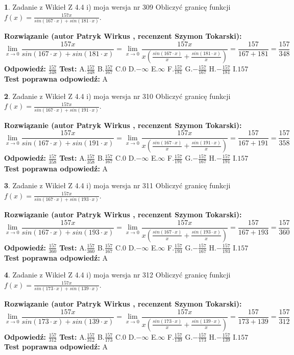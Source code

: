 \documentclass[12pt, a4paper]{article}
\theoremstyle{definition} %
\newtheorem{zad}{}
\newcommand{\zadStart}[1]{\begin{zad}#1\newline}
\newcommand{\zadStop}{\end{zad}}
\newcommand{\rozwStart}[2]{\noindent \textbf{Rozwiązanie (autor #1 , recenzent #2): }\newline}
\newcommand{\rozwStop}{\newline}
\newcommand{\odpStart}{\noindent \textbf{Odpowiedź:}\newline}
\newcommand{\odpStop}{\newline}
\newcommand{\testStart}{\noindent \textbf{Test:}\newline}
\newcommand{\testStop}{\newline}
\newcommand{\kluczStart}{\noindent \textbf{Test poprawna odpowiedź:}\newline}
\newcommand{\kluczStop}{\newline}
\begin{document}
\zadStart{Zadanie z Wikieł Z 4.4 i) moja wersja nr 309}
Obliczyć granicę funkcji $f(x)=\frac{157x}{sin(167\cdot x) +sin(181\cdot x)}$.
\zadStop
\rozwStart{Patryk Wirkus}{Szymon Tokarski}
$$\lim\limits_{x\to 0}\frac{157x}{sin(167\cdot x) +sin(181\cdot x)}=\lim\limits_{x\to 0}\frac{157x}{x(\frac{sin(167\cdot x)}{x}+\frac{sin(181\cdot x)}{x})}=\frac{157}{167+181} = \frac{157}{348}$$
\rozwStop
\odpStart
$\frac{157}{348}$
\odpStop
\testStart
A.$\frac{157}{348}$
B.$\frac{157}{167}$
C.$0$
D.$-\infty$
E.$\infty$
F.$\frac{157}{181}$
G.$-\frac{157}{167}$
H.$-\frac{157}{181}$
I.$157$
\testStop
\kluczStart
A
\kluczStop



\zadStart{Zadanie z Wikieł Z 4.4 i) moja wersja nr 310}
Obliczyć granicę funkcji $f(x)=\frac{157x}{sin(167\cdot x) +sin(191\cdot x)}$.
\zadStop
\rozwStart{Patryk Wirkus}{Szymon Tokarski}
$$\lim\limits_{x\to 0}\frac{157x}{sin(167\cdot x) +sin(191\cdot x)}=\lim\limits_{x\to 0}\frac{157x}{x(\frac{sin(167\cdot x)}{x}+\frac{sin(191\cdot x)}{x})}=\frac{157}{167+191} = \frac{157}{358}$$
\rozwStop
\odpStart
$\frac{157}{358}$
\odpStop
\testStart
A.$\frac{157}{358}$
B.$\frac{157}{167}$
C.$0$
D.$-\infty$
E.$\infty$
F.$\frac{157}{191}$
G.$-\frac{157}{167}$
H.$-\frac{157}{191}$
I.$157$
\testStop
\kluczStart
A
\kluczStop



\zadStart{Zadanie z Wikieł Z 4.4 i) moja wersja nr 311}
Obliczyć granicę funkcji $f(x)=\frac{157x}{sin(167\cdot x) +sin(193\cdot x)}$.
\zadStop
\rozwStart{Patryk Wirkus}{Szymon Tokarski}
$$\lim\limits_{x\to 0}\frac{157x}{sin(167\cdot x) +sin(193\cdot x)}=\lim\limits_{x\to 0}\frac{157x}{x(\frac{sin(167\cdot x)}{x}+\frac{sin(193\cdot x)}{x})}=\frac{157}{167+193} = \frac{157}{360}$$
\rozwStop
\odpStart
$\frac{157}{360}$
\odpStop
\testStart
A.$\frac{157}{360}$
B.$\frac{157}{167}$
C.$0$
D.$-\infty$
E.$\infty$
F.$\frac{157}{193}$
G.$-\frac{157}{167}$
H.$-\frac{157}{193}$
I.$157$
\testStop
\kluczStart
A
\kluczStop



\zadStart{Zadanie z Wikieł Z 4.4 i) moja wersja nr 312}
Obliczyć granicę funkcji $f(x)=\frac{157x}{sin(173\cdot x) +sin(139\cdot x)}$.
\zadStop
\rozwStart{Patryk Wirkus}{Szymon Tokarski}
$$\lim\limits_{x\to 0}\frac{157x}{sin(173\cdot x) +sin(139\cdot x)}=\lim\limits_{x\to 0}\frac{157x}{x(\frac{sin(173\cdot x)}{x}+\frac{sin(139\cdot x)}{x})}=\frac{157}{173+139} = \frac{157}{312}$$
\rozwStop
\odpStart
$\frac{157}{312}$
\odpStop
\testStart
A.$\frac{157}{312}$
B.$\frac{157}{173}$
C.$0$
D.$-\infty$
E.$\infty$
F.$\frac{157}{139}$
G.$-\frac{157}{173}$
H.$-\frac{157}{139}$
I.$157$
\testStop
\kluczStart
A
\kluczStop
\end{document}
